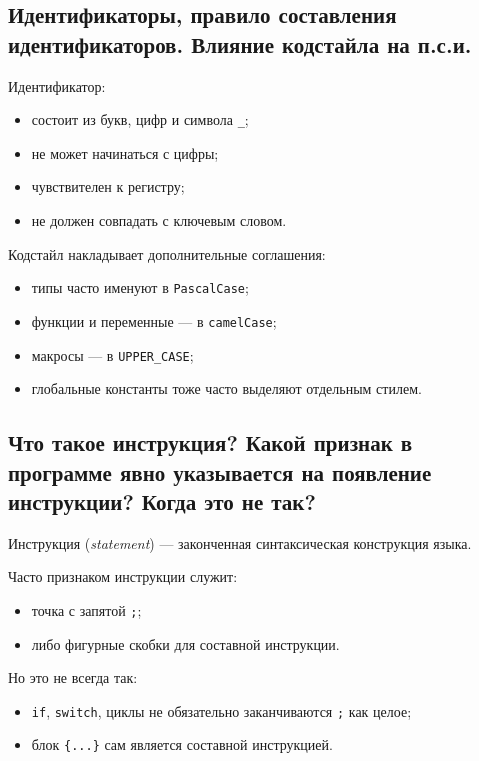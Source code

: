 \subsection{Идентификаторы, правило составления идентификаторов. Влияние кодстайла на п.с.и.}

Идентификатор:
\begin{itemize}
    \item состоит из букв, цифр и символа \texttt{\_};
    \item не может начинаться с цифры;
    \item чувствителен к регистру;
    \item не должен совпадать с ключевым словом.
\end{itemize}

Кодстайл накладывает дополнительные соглашения:
\begin{itemize}
    \item типы часто именуют в \texttt{PascalCase};
    \item функции и переменные --- в \texttt{camelCase};
    \item макросы --- в \texttt{UPPER\_CASE};
    \item глобальные константы тоже часто выделяют отдельным стилем.
\end{itemize}


\subsection{Что такое инструкция? Какой признак в программе явно указывается на появление инструкции? Когда это не так?}

\begin{definition}[Инструкция]
Инструкция (\textit{statement}) --- законченная синтаксическая конструкция языка.
\end{definition}

Часто признаком инструкции служит:
\begin{itemize}
    \item точка с запятой \texttt{;};
    \item либо фигурные скобки для составной инструкции.
\end{itemize}

Но это не всегда так:
\begin{itemize}
    \item \texttt{if}, \texttt{switch}, циклы не обязательно заканчиваются \texttt{;} как целое;
    \item блок \texttt{\{...\}} сам является составной инструкцией.
\end{itemize}


